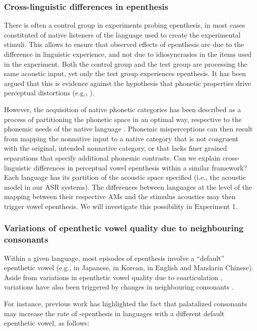 {\subsubsection{Cross-linguistic differences in epenthesis}
There is often a control group in experiments probing epenthesis, in most cases constituted of native listeners of the language used to create the experimental stimuli. This allows to ensure that observed effects of epenthesis are due to the difference in linguistic experience, and not due to idiosyncrasies in the items used in the experiment. 
Both the control group and the test group are processing the same acoustic input, yet only the test group experiences epenthesis. It has been argued that this is evidence against the hypothesis that phonetic properties drive perceptual distortions (e.g., \cite{berent2007}).

However, the acquisition of native phonetic categories has been described as a process of partitioning the phonetic space in an optimal way, respective to the phonemic needs of the native language \cite{best1994, kuhl1995}. Phonemic misperceptions can then result from mapping the nonnative input to a native category that is not congruent with the original, intended nonnative category, or that lacks finer grained separations that specify additional phonemic contrasts.    
Can we explain cross-linguistic differences in perceptual vowel epenthesis within a similar framework? Each language has its partition of the acoustic space specified (i.e., the acoustic model in our ASR systems). The differences between languages at the level of the mapping between their respective AMs and the stimulus acoustics may then trigger vowel epenthesis. We will investigate this possibility in Experiment 1. 
 
\subsubsection{Variations of epenthetic vowel quality due to neighbouring consonants} 
Within a given language, most episodes of epenthesis involve a ``default'' epenthetic vowel (e.g., \textipa{[W]} in Japanese, \textipa{[1]} in Korean, \textipa{[@]} in English and Mandarin Chinese). Aside from variations in epenthetic vowel quality due to coarticulation \cite{dupoux2011, guekozIS17, guekozJASA17}, variations have also been triggered by changes in neighbouring consonants \cite{mattingley2015, durvasula2015, durvasula2018}.

For instance, previous work has highlighted the fact that palatalized consonants may increase the rate of -epenthesis in languages with a different default epenthetic vowel, as follows:

}
